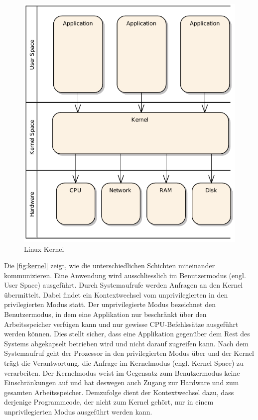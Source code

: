 \begin{figure}
\centering
\includegraphics[scale=0.8]{images/kernel.pdf}
\caption{Linux Kernel}
\label{fig:kernel}
\end{figure}

Die \autoref{fig:kernel} zeigt, wie die unterschiedlichen Schichten miteinander kommunizieren. Eine Anwendung wird ausschliesslich im Benutzermodus (engl. User Space) ausgeführt. Durch Systemaufrufe werden Anfragen an den Kernel übermittelt. Dabei findet ein Kontextwechsel vom unprivilegierten in den privilegierten Modus statt. Der unprivilegierte Modus bezeichnet den Benutzermodus, in dem eine Applikation nur beschränkt über den Arbeitsspeicher verfügen kann und nur gewisse CPU-Befehlssätze ausgeführt werden können. Dies stellt sicher, dass eine Applikation gegenüber dem Rest des Systems abgekapselt betrieben wird und nicht darauf zugreifen kann. Nach dem Systemaufruf geht der Prozessor in den privilegierten Modus über und der Kernel trägt die Verantwortung, die Anfrage im Kernelmodus (engl. Kernel Space) zu verarbeiten. Der Kernelmodus weist im Gegensatz zum Benutzermodus keine Einschränkungen auf und hat deswegen auch Zugang zur Hardware und zum gesamten Arbeitsspeicher. Demzufolge dient der Kontextwechsel dazu, dass derjenige Programmcode, der nicht zum Kernel gehört, nur in einem unprivilegierten Modus ausgeführt werden kann.


